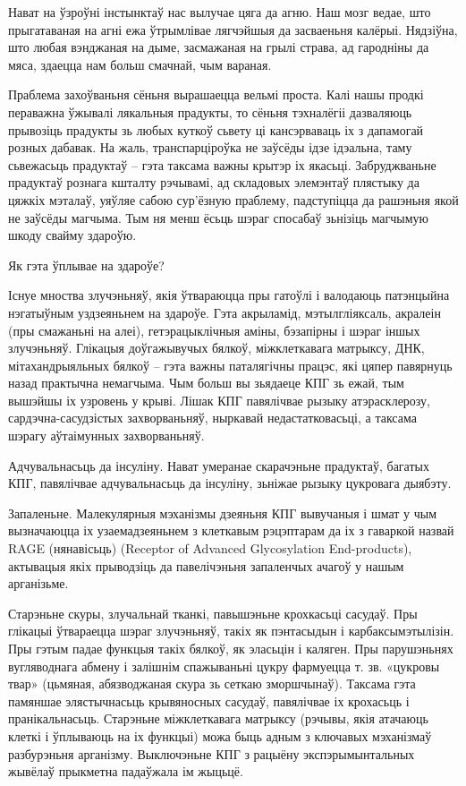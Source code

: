 Нават на ўзроўні інстынктаў нас вылучае цяга да агню. Наш мозг ведае, што прыгатаваная на агні ежа ўтрымлівае лягчэйшыя да засваеньня калёрыі. Нядзіўна, што любая вэнджаная на дыме, засмажаная на грылі страва, ад гародніны да мяса, здаецца нам больш смачнай, чым вараная.

Праблема захоўваньня сёньня вырашаецца вельмі проста. Калі нашы продкі пераважна ўжывалі лякальныя прадукты, то сёньня тэхналёгіі дазваляюць прывозіць прадукты зь любых куткоў сьвету ці кансэрваваць іх з дапамогай розных дабавак. На жаль, транспарціроўка не заўсёды ідзе ідэальна, таму сьвежасьць прадуктаў – гэта таксама важны крытэр іх якасьці. Забруджваньне прадуктаў рознага кшталту рэчывамі, ад складовых элемэнтаў плястыку да цяжкіх мэталаў, уяўляе сабою сур'ёзную праблему, падступіцца да рашэньня якой не заўсёды магчыма. Тым ня менш ёсьць шэраг спосабаў зьнізіць магчымую шкоду свайму здароўю.

Як гэта ўплывае на здароўе?

Існуе мноства злучэньняў, якія ўтвараюцца пры гатоўлі і валодаюць патэнцыйна нэгатыўным уздзеяньнем на здароўе. Гэта акрыламід, мэтылгліяксаль, акралеін (пры смажаньні на алеі), гетэрацыклічныя аміны, бэзапірны і шэраг іншых злучэньняў. Глікацыя доўгажывучых бялкоў, міжклеткавага матрыксу, ДНК, мітахандрыяльных бялкоў – гэта важны паталягічны працэс, які цяпер павярнуць назад практычна немагчыма. Чым больш вы зьядаеце КПГ зь ежай, тым вышэйшы іх узровень у крыві. Лішак КПГ павялічвае рызыку атэрасклерозу, сардэчна-сасудзістых захворваньняў, ныркавай недастатковасьці, а таксама шэрагу аўтаімунных захворваньняў.

Адчувальнасьць да інсуліну.
Нават умеранае скарачэньне прадуктаў, багатых КПГ, павялічвае адчувальнасьць да інсуліну, зьніжае рызыку цукровага дыябэту.

Запаленьне.
Малекулярныя мэханізмы дзеяньня КПГ вывучаныя і шмат у чым вызначаюцца іх узаемадзеяньнем з клеткавым рэцэптарам да іх з гаваркой назвай RAGE (нянавісьць) (Receptor of Advanced Glycosylation End-products), актывацыя якіх прыводзіць да павелічэньня запаленчых ачагоў у нашым арганізьме.

Старэньне скуры, злучальнай тканкі, павышэньне крохкасьці сасудаў.
Пры глікацыі ўтвараецца шэраг злучэньняў, такіх як пэнтасыдын і карбаксымэтылізін. Пры гэтым падае функцыя такіх бялкоў, як эласьцін і каляген. Пры парушэньнях вугляводнага абмену і залішнім спажываньні цукру фармуецца т. зв. «цукровы твар» (цьмяная, абязводжаная скура зь сеткаю зморшчынаў). Таксама гэта памяншае элястычнасьць крывяносных сасудаў, павялічвае іх крохасьць і пранікальнасьць. Старэньне міжклеткавага матрыксу (рэчывы, якія атачаюць клеткі і ўплываюць на іх функцыі) можа быць адным з ключавых мэханізмаў разбурэньня арганізму. Выключэньне КПГ з рацыёну экспэрымынтальных жывёлаў прыкметна падаўжала ім жыцьцё.

